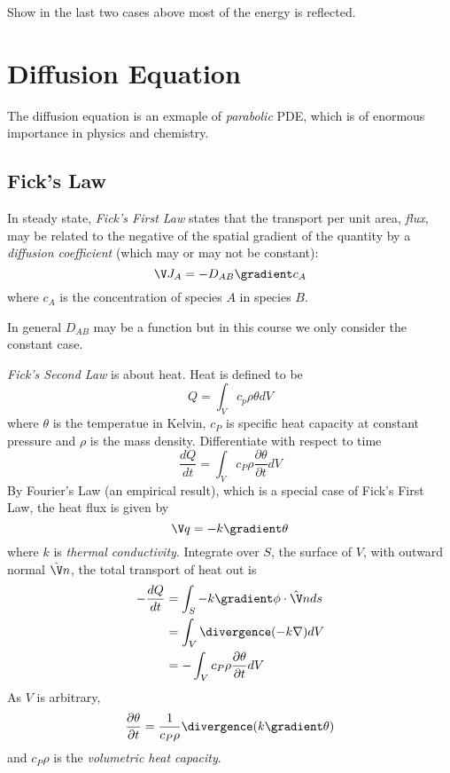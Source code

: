 \documentclass[a4paper]{article}
\newcommand*{\grad}{\gradient}
\newcommand*{\dive}{\divergence}
\begin{document}
\begin{ex}
  Show in the last two cases above most of the energy is reflected.
\end{ex}

\section{Diffusion Equation}

The diffusion equation is an exmaple of \emph{parabolic} PDE, which is of enormous importance in physics and chemistry.

\subsection{Fick's Law}

In steady state, \emph{Fick's First Law} states that the transport per unit area, \emph{flux}, may be related to the negative of the spatial gradient of the quantity by a \emph{diffusion coefficient} (which may or may not be constant):
\[
  \V J_A = -D_{AB} \grad c_A
\]
where \(c_A\) is the concentration of species \(A\) in species \(B\).

In general \(D_{AB}\) may be a function but in this course we only consider the constant case.

\emph{Fick's Second Law} is about heat. Heat is defined to be
\[
  Q = \int_{V}^{ } c_p \rho \theta dV
\]
where \(\theta\) is the temperatue in Kelvin, \(c_P\) is specific heat capacity at constant pressure and \(\rho\) is the mass density. Differentiate with respect to time
\[
  \frac{dQ}{dt} = \int_{V}^{ } c_P \rho \frac{\partial \theta}{\partial t} dV
\]
By Fourier's Law (an empirical result), which is a special case of Fick's First Law, the heat flux is given by
\[
  \V q = -k \grad \theta
\]
where \(k\) is \emph{thermal conductivity}. Integrate over \(S\), the surface of \(V\), with outward normal \(\hat \V n\), the total transport of heat out is
\begin{align*}
  -\frac{dQ}{dt} &= \int_{S}^{ } -k\grad \phi \cdot \hat \V n ds \\
                 &= \int_{V}^{ } \dive (-k \nabla) dV \\
                 &= -\int_{V}^{ } c_P \rho \frac{\partial \theta}{\partial t} dV
\end{align*}
As \(V\) is arbitrary,
\[
  \frac{\partial \theta}{\partial t} = \frac{1}{c_P \rho} \dive (k \grad \theta)
\]
and \(c_P\rho\) is the \emph{volumetric heat capacity}.
\end{document}
